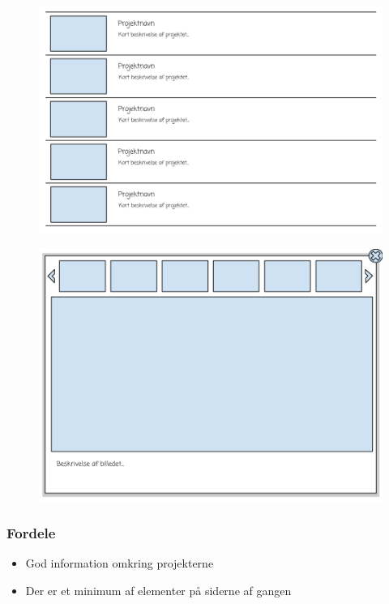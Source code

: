\documentclass[a4paper,titlepage,fleqn,12pt]{article}
\begin{document}
\begin{figure}[H]
	\includegraphics[width=\textwidth]{Sketch2_1.png}
\end{figure}

\begin{figure}[H]
	\includegraphics[width=\textwidth]{Sketch2_2.png}
\end{figure}

\subsubsection{Fordele}
\begin{itemize}
	\item God information omkring projekterne
	\item Der er et minimum af elementer på siderne af gangen
\end{itemize}
\end{document}
